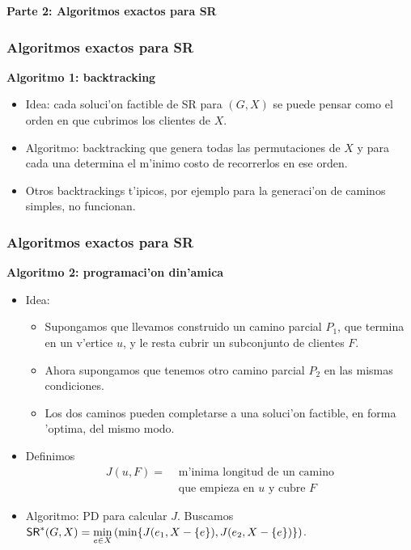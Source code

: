 \documentclass{beamer}
\newcommand{\probl}[1]{\textnormal{\textsf{#1}}}
\begin{document}
\begin{frame}
\begin{center}
\begin{Large}
\textbf{Parte 2: Algoritmos exactos para \probl{SR}}
\end{Large}
\end{center}
\end{frame}

\begin{frame}
\frametitle{Algoritmos exactos para \probl{SR}}

\textbf{Algoritmo 1: backtracking}
\pause
\begin{itemize}
	\item Idea: cada soluci'on factible de \probl{SR} para $(G, X)$ se puede pensar como el orden en que cubrimos los clientes de $X$.
	\pause
	\item Algoritmo: backtracking que genera todas las permutaciones de $X$ y para cada una determina el m'inimo costo de recorrerlos en ese orden.
	\pause
	\item Otros backtrackings t'ipicos, por ejemplo para la generaci'on de caminos simples, no funcionan.
\end{itemize}
\end{frame}


\begin{frame}
\frametitle{Algoritmos exactos para \probl{SR}}

\textbf{Algoritmo 2: programaci'on din'amica}
\pause
\begin{itemize}
	\item Idea:
	\begin{itemize}
		\item Supongamos que llevamos construido un camino parcial $P_1$, que termina en un v'ertice $u$, y le resta cubrir un subconjunto de clientes $F$.
		\pause
		\item Ahora supongamos que tenemos otro camino parcial $P_2$ en las mismas condiciones.
		\pause
		\item Los dos caminos pueden completarse a una soluci'on factible, en forma 'optima, del mismo modo.
	\end{itemize}
	\pause
	\item Definimos 
\begin{align*}
J(u, F) =&\text{ m'inima longitud de un camino}\\
	&\text{ que empieza en } u \text{ y cubre }F
\end{align*}
	\pause
	\item Algoritmo: PD para calcular $J$. Buscamos $\probl{SR}^*(G, X) = \min\limits_{e \in X}\left(\min\{J(e_1, X - \{e\}), J(e_2, X - \{e\})\}\right)$. 
\end{itemize}
\end{frame}
\end{document}
